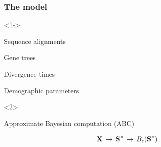 \begin{frame}[t]
    \frametitle{The \msb model}
        \begin{onlyenv}<1->
        \smallskip
        \begin{mydescription}
            \item[\alignmentVector] Sequence alignments
            \item[\geneTreeVector] Gene trees
            \item[\divTimeMapVector] Divergence times
            \item[\demographicParamVector] Demographic parameters
        \end{mydescription}
        \end{onlyenv}
    \begin{onlyenv}<2>
    \smallskip
        \centerline{Approximate Bayesian computation (ABC)}
        \[ \alignmentVector \, \to \, \ssVectorObs \, \to \, \ssSpace\]
    \end{onlyenv}
\end{frame}

